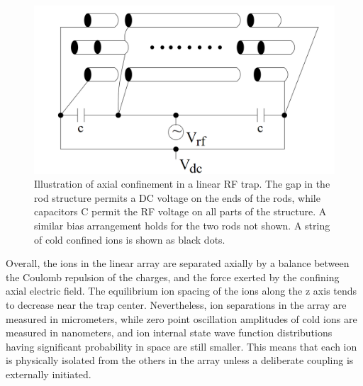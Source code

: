 \documentclass[../main.tex]{subfiles}
\begin{document}
\begin{figure}[!ht]
    \centering
    \includegraphics[scale = 0.3]{images/linearPaulTrap.png}
    \caption{\cite{Englert2006QuantumCD} Illustration of axial confinement in a linear RF trap. The gap in the rod structure permits a DC voltage on the ends of the rods, while capacitors C permit the RF voltage on all parts of the structure. A similar bias arrangement holds for the two rods not shown. A string of cold confined ions is shown as black dots.}
\end{figure}

\noindent Overall, the ions in the linear array are separated axially by a balance between the Coulomb repulsion of the charges, and the force exerted by the confining axial electric field. The equilibrium ion spacing of the ions along the z axis tends to decrease near the trap center. Nevertheless, ion separations in the array are measured in micrometers, while zero point oscillation amplitudes of cold ions are measured in nanometers, and ion internal state wave function distributions having significant probability in space are still smaller. This means that each ion is physically isolated from the others in the array unless a deliberate coupling is externally initiated.
\end{document}
